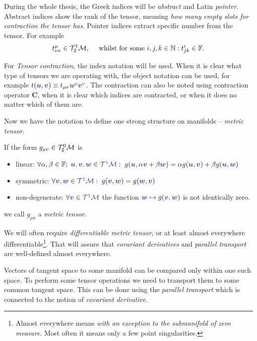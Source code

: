 During the whole thesis, the Greek indices will be \emph{abstract} and Latin \emph{pointer}. Abstract indices show the rank of the tensor, meaning \emph{how many empty slots for contraction the tensor has}. Pointer indices extract specific number from the tensor. For example
$$t^\mu_{\nu\kappa} \in \mathcal{T}^1_2\mathcal{M}, \quad \text{ whilst for some }i,j,k\in\mathbb{N}: t^i_{jk}\in \mathbb F.$$

For \emph{Tensor contraction}, the index notation will be used. When it is clear what type of tensors we are operating with, the object notation can be used, for example $t(\bluee{\bm u},\bluee{\bm v})\equiv t_{\mu\nu}\bluee{\bm u^\mu \bm v^\nu}$. The contraction can also be noted using contraction operator $\mathbf C$, when it is clear which indices are contracted, or when it does no matter which of them are.

Now we have the notation to define one strong structure on manifolds -- \emph{metric tensor}. 
\begin{definition}
If the form $g_{\mu\nu}\in\mathcal{T}^0_2\mathcal{M}$ is
\begin{itemize}
    \item linear: $\forall \alpha,\beta\in\mathbb F;\; \bluee{\bm u,\bm v,\bm w}\in \bluee{\TT^1\M}: \; g(\bluee{\bm u},\alpha\bluee{\bm v}+\beta \bluee{\bm w}) = \alpha g(\bluee{\bm u},\bluee{\bm v})+\beta g(\bluee{\bm u},\bluee{\bm w})$
    \item symmetric: $\forall \bluee{\bm v,\bm w}\in \bluee{\TT^1\M}: \; g(\bluee{\bm v},\bluee{\bm w})=g(\bluee{\bm w},\bluee{\bm v})$ 
    \item non-degenerate: $\forall \bluee{\bm v}\in\bluee{\TT^1\M}$ the function $\bluee{\bm w}\mapsto g(\bluee{\bm v},\bluee{\bm w})$ is not identically zero.
\end{itemize} 
we call $g_{\mu\nu}$ a \emph{metric tensor}.
\end{definition}

We will often require \emph{differentiable metric tensor}, or at least almost everywhere differentiable\footnote{Almost everywhere means \emph{with an exception to the submanifold of zero measure}. Most often it means only a few point singularities.}. That will assure that \emph{covariant derivatives} and \emph{parallel transport} are well-defined almost everywhere. 




Vectors of tangent space to some manifold can be compared only within one such space. To perform some tensor operations we need to transport them to some common tangent space. This can be done using the \emph{parallel transport} which is connected to the notion of \emph{covariant derivative}.

